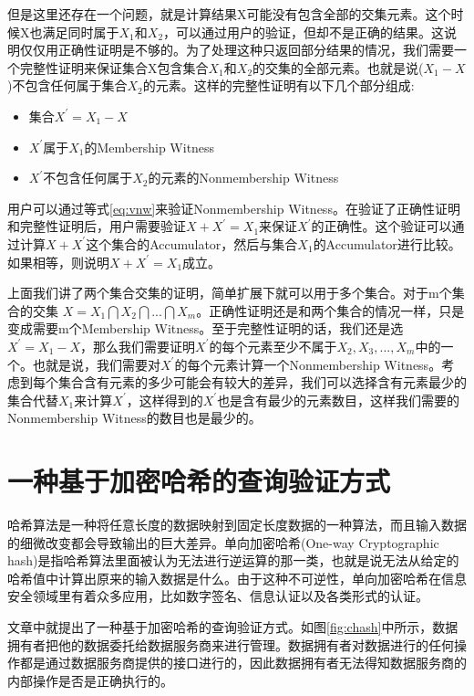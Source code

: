 但是这里还存在一个问题，就是计算结果X可能没有包含全部的交集元素。这个时候X也满足同时属于$X_1$和$X_2$，可以通过用户的验证，但却不是正确的结果。这说明仅仅用正确性证明是不够的。为了处理这种只返回部分结果的情况，我们需要一个完整性证明来保证集合X包含集合$X_1$和$X_2$的交集的全部元素。也就是说($X_1 - X$)不包含任何属于集合$X_2$的元素。这样的完整性证明有以下几个部分组成:
\begin{itemize}
\item 集合$X^\prime = X_1 - X$
\item $X^\prime$属于$X_1$的Membership Witness
\item $X^\prime$不包含任何属于$X_2$的元素的Nonmembership Witness
\end{itemize}

用户可以通过等式\ref{eq:vnw}来验证Nonmembership Witness。在验证了正确性证明和完整性证明后，用户需要验证$X + X^\prime = X_1$来保证$X^\prime$的正确性。这个验证可以通过计算$X + X^\prime$这个集合的Accumulator，然后与集合$X_1$的Accumulator进行比较。如果相等，则说明$X + X^\prime = X_1$成立。

上面我们讲了两个集合交集的证明，简单扩展下就可以用于多个集合。对于m个集合的交集 $X = X_1 \bigcap X_2 \bigcap ... \bigcap X_m$。正确性证明还是和两个集合的情况一样，只是变成需要m个Membership Witness。至于完整性证明的话，我们还是选$X^\prime = X_1 - X$，那么我们需要证明$X^\prime$的每个元素至少不属于$X_2, X_3,...,X_m$中的一个。也就是说，我们需要对$X^\prime$的每个元素计算一个Nonmembership Witness。考虑到每个集合含有元素的多少可能会有较大的差异，我们可以选择含有元素最少的集合代替$X_1$来计算$X^\prime$，这样得到的$X^\prime$也是含有最少的元素数目，这样我们需要的Nonmembership Witness的数目也是最少的。

\section{一种基于加密哈希的查询验证方式}
哈希算法是一种将任意长度的数据映射到固定长度数据的一种算法，而且输入数据的细微改变都会导致输出的巨大差异。单向加密哈希(One-way Cryptographic hash)是指哈希算法里面被认为无法进行逆运算的那一类，也就是说无法从给定的哈希值中计算出原来的输入数据是什么。由于这种不可逆性，单向加密哈希在信息安全领域里有着众多应用，比如数字签名、信息认证以及各类形式的认证。

文章\cite{sion2005query}中就提出了一种基于加密哈希的查询验证方式。如图\ref{fig:chash}中所示，数据拥有者把他的数据委托给数据服务商来进行管理。数据拥有者对数据进行的任何操作都是通过数据服务商提供的接口进行的，因此数据拥有者无法得知数据服务商的内部操作是否是正确执行的。

